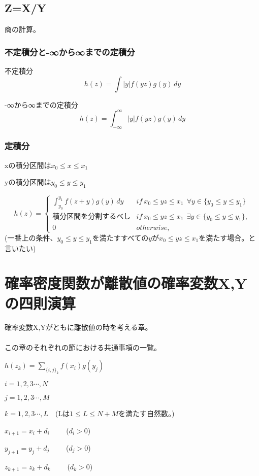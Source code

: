 \documentclass[a4paper,11pt]{ltjsarticle}
\begin{document}
\subsection{Z=X/Y}
商の計算。
\subsubsection{不定積分と-∞から∞までの定積分}
不定積分
$$
    h(z) = \int |y| f(yz) g(y)\,dy
$$

-∞から∞までの定積分
$$
    h(z) = \int_{-\infty}^{\infty} |y| f(yz) g(y)\,dy
$$
\subsubsection{定積分}
\begin{description}
    \item xの積分区間は$x_0 \leq x \leq x_1$
    \item yの積分区間は$y_0 \leq y \leq y_1$
\end{description}
$$
    h(z)=
    \begin{cases}
        \int_{y_0}^{y_1} f(z+y) g(y)\,dy    & if\ x_0 \leq yz \leq x_1 \ \ \forall y\in \{ y_0 \leq y \leq y_1\}\\
        積分区間を分割するべし                & if\ x_0 \leq yz \leq x_1 \ \ \exists y\in \{ y_0 \leq y \leq y_1\}, \\
        0                                   & otherwise,
    \end{cases}
$$
(一番上の条件、$y_0 \leq y \leq y_1$を満たすすべての$y$が$x_0 \leq yz \leq x_1$を満たす場合。と言いたい)

\newpage


\section{確率密度関数が離散値の確率変数X,Yの四則演算}
確率変数X,Yがともに離散値の時を考える章。\\
\\

この章のそれぞれの節における共通事項の一覧。
\begin{description}
    \item $h(z_k) = \sum_{\{i,j\}_k} f(x_i) g(y_j)$
    \item $i=1,2,3\cdots,N$
    \item $j=1,2,3\cdots,M$
    \item $k=1,2,3\cdots,L$\ \ (Lは$1\leq L \leq N+M$を満たす自然数。)
    \item $x_{i+1}=x_i+d_i$ \ \ \ \ ($d_i>0$)
    \item $y_{j+1}=y_j+d_j$ \ \ \ \ ($d_j>0$)
    \item $z_{k+1}=z_k+d_k$ \ \ \ \ ($d_k>0$)
\end{description}
\end{document}
